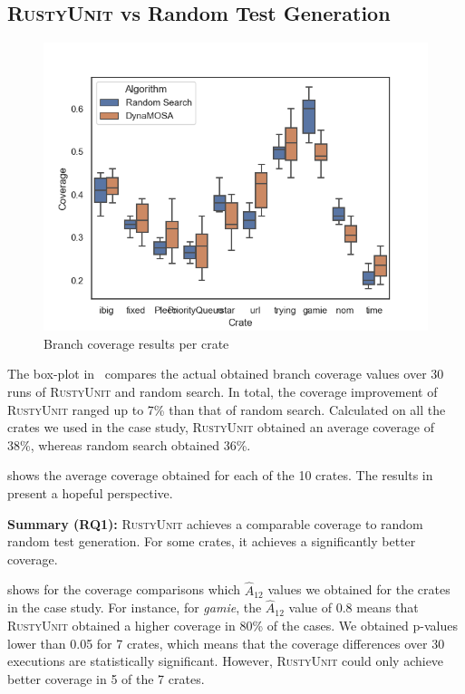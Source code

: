 \documentclass[paper=a4,%
  twoside,%
  BCOR4mm,%
  abstract=true,%
  toc=bibliography,%
  chapterprefix=true,%
  toc=bibliographynumbered,%
  open=right,%
  english,%
  pagesize=pdftex]{scrreprt}
\newcommand{\benchnum}{10\xspace}
\newcommand{\tech}{\textsc{RustyUnit}\xspace}
\newcommand{\runs}{30\xspace}
\begin{document}
\subsection{\tech vs Random Test Generation}
\begin{figure}[ht]
\caption{\label{fig:results-ru-rs-coverage}Branch coverage results per crate}
\centering
\includegraphics[width=\textwidth]{coverage}
\end{figure}

The box-plot in~ compares the actual obtained branch coverage values over \runs runs of \tech and random search. In total, the coverage improvement of \tech ranged up to 7\% than that of random search. Calculated on all the crates we used in the case study, \tech obtained an average coverage of 38\%, whereas random search obtained 36\%.

 shows the average coverage obtained for each of the \benchnum crates. The results in~ present a hopeful perspective. 

\begin{tcolorbox}
\textbf{Summary (RQ1):} \tech achieves a comparable coverage to random random test generation. For some crates, it achieves a significantly better coverage. 
\end{tcolorbox}

 shows for the coverage comparisons which $\hat{A}_{12}$ values we obtained for the crates in the case study. For instance, for \emph{gamie}, the $\hat{A}_{12}$ value of 0.8 means that \tech obtained a higher coverage in 80\% of the cases. We obtained p-values lower than 0.05 for 7 crates, which means that the coverage differences over \runs executions are statistically significant. However, \tech could only achieve better coverage in 5 of the 7 crates. 
\end{document}
